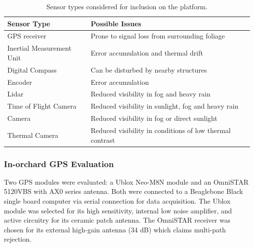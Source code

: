 \documentclass[preprint,authoryear,12pt]{elsarticle}
\begin{document}
    \begin{table}[htbp]
        \centering
        \footnotesize
        \begin{tabular}{ l l}
            \textbf{Sensor Type}      &\textbf{Possible Issues} \\ \hline
            GPS receiver              & Prone to signal loss from surrounding foliage\\  \hline
            Inertial Measurement Unit & Error accumulation and thermal drift\\ \hline
            Digital Compass           & Can be disturbed by nearby structures\\ \hline
            Encoder                   & Error accumulation \\ \hline
            Lidar                     & Reduced visibility in fog and heavy rain \\ \hline
            Time of Flight Camera     & Reduced visibility in sunlight, fog and heavy rain \\ \hline
            Camera                    & Reduced visibility in fog or direct sunlight \\ \hline
            Thermal Camera            & Reduced visibility in conditions of low thermal contrast\\ \hline
        \end{tabular}
        \label{table:sensor_comparison}
        \caption{Sensor types considered for inclusion on the platform.}
    \end{table}


    \subsubsection{In-orchard GPS Evaluation}
        Two GPS modules were evaluated: a Ublox Neo-M8N module and an OmniSTAR 5120VBS with AX0 series antenna.
    	Both were connected to a Beaglebone Black single board computer via serial connection for data acquisition.
        The Ublox module was selected for its high sensitivity, internal low noise amplifier, and active circuitry for its ceramic patch antenna.
        The OmniSTAR receiver was chosen for its external high-gain antenna (34 dB) which claims multi-path rejection.
\end{document}
